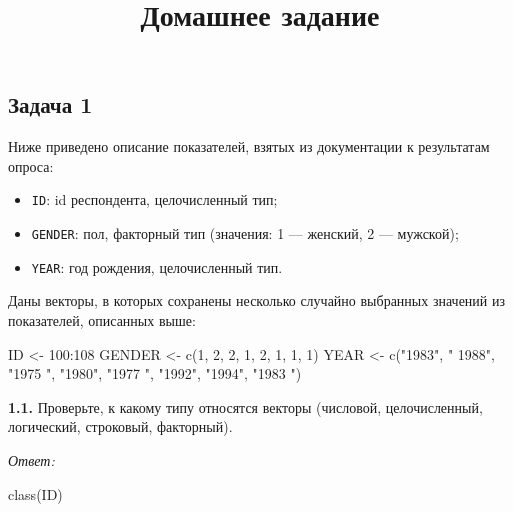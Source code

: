 \documentclass[
]{article}
\title{Домашнее задание}
\author{}
\date{\vspace{-2.5em}}
\newenvironment{Shaded}{\begin{snugshade}}{\end{snugshade}}
\newcommand{\DecValTok}[1]{\textcolor[rgb]{0.00,0.00,0.81}{#1}}
\newcommand{\FunctionTok}[1]{\textcolor[rgb]{0.00,0.00,0.00}{#1}}
\newcommand{\NormalTok}[1]{#1}
\newcommand{\OtherTok}[1]{\textcolor[rgb]{0.56,0.35,0.01}{#1}}
\newcommand{\SpecialCharTok}[1]{\textcolor[rgb]{0.00,0.00,0.00}{#1}}
\newcommand{\StringTok}[1]{\textcolor[rgb]{0.31,0.60,0.02}{#1}}
\providecommand{\tightlist}{%
  \setlength{\itemsep}{0pt}\setlength{\parskip}{0pt}}
\begin{document}
\maketitle

\hypertarget{ux437ux430ux434ux430ux447ux430-1}{%
\subsection{Задача 1}\label{ux437ux430ux434ux430ux447ux430-1}}

Ниже приведено описание показателей, взятых из документации к
результатам опроса:

\begin{itemize}
\tightlist
\item
  \texttt{ID}: id респондента, целочисленный тип;
\item
  \texttt{GENDER}: пол, факторный тип (значения: 1 --- женский, 2 ---
  мужской);
\item
  \texttt{YEAR}: год рождения, целочисленный тип.
\end{itemize}

Даны векторы, в которых сохранены несколько случайно выбранных значений
из показателей, описанных выше:

\begin{Shaded}
\begin{Highlighting}[]
\NormalTok{ID }\OtherTok{\textless{}{-}} \DecValTok{100}\SpecialCharTok{:}\DecValTok{108}
\NormalTok{GENDER }\OtherTok{\textless{}{-}} \FunctionTok{c}\NormalTok{(}\DecValTok{1}\NormalTok{, }\DecValTok{2}\NormalTok{, }\DecValTok{2}\NormalTok{, }\DecValTok{1}\NormalTok{, }\DecValTok{2}\NormalTok{, }\DecValTok{1}\NormalTok{, }\DecValTok{1}\NormalTok{, }\DecValTok{1}\NormalTok{)}
\NormalTok{YEAR }\OtherTok{\textless{}{-}} \FunctionTok{c}\NormalTok{(}\StringTok{"1983"}\NormalTok{, }\StringTok{" 1988"}\NormalTok{, }\StringTok{"1975 "}\NormalTok{, }\StringTok{"1980"}\NormalTok{, }\StringTok{"1977  "}\NormalTok{, }\StringTok{"1992"}\NormalTok{, }\StringTok{"1994"}\NormalTok{, }\StringTok{"1983 "}\NormalTok{)}
\end{Highlighting}
\end{Shaded}

\textbf{1.1.} Проверьте, к какому типу относятся векторы (числовой,
целочисленный, логический, строковый, факторный).

\emph{Ответ:}

\begin{Shaded}
\begin{Highlighting}[]
\FunctionTok{class}\NormalTok{(ID)}
\end{Highlighting}
\end{Shaded}
\end{document}
